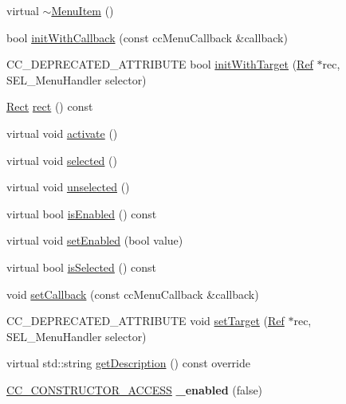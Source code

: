 \begin{DoxyCompactItemize}
virtual \hyperlink{classMenuItem_a41c6086a4d066256ecb7bfa715059ea2}{$\sim$\+Menu\+Item} ()
\item 
bool \hyperlink{classMenuItem_a15599490c1ba216f1a87394b798859dd}{init\+With\+Callback} (const cc\+Menu\+Callback \&callback)
\item 
C\+C\+\_\+\+D\+E\+P\+R\+E\+C\+A\+T\+E\+D\+\_\+\+A\+T\+T\+R\+I\+B\+U\+TE bool \hyperlink{classMenuItem_af427b11bfc6e76d5d2c93c94dafd7aa6}{init\+With\+Target} (\hyperlink{classRef}{Ref} $\ast$rec, S\+E\+L\+\_\+\+Menu\+Handler selector)
\item 
\hyperlink{classRect}{Rect} \hyperlink{classMenuItem_a3d6b05193856cc8d5e5e2a2d98736e4c}{rect} () const
\item 
virtual void \hyperlink{classMenuItem_a914d3ef5d07ab6da23618d4d8c3e33cd}{activate} ()
\item 
virtual void \hyperlink{classMenuItem_a4ae00eee33600b702f1019643d6b0ccf}{selected} ()
\item 
virtual void \hyperlink{classMenuItem_a515f26e1cfec9e1f46bdd898c5698723}{unselected} ()
\item 
virtual bool \hyperlink{classMenuItem_ad55ab1194b24473df5fef4ae12ac22f7}{is\+Enabled} () const
\item 
virtual void \hyperlink{classMenuItem_ac7bf0c009319b077ee6f34ee6b83ae03}{set\+Enabled} (bool value)
\item 
virtual bool \hyperlink{classMenuItem_a1c6d2c32aa42988ecb019a5009a8c005}{is\+Selected} () const
\item 
void \hyperlink{classMenuItem_a313b2ac1d809dea921aacc47ad8aef0f}{set\+Callback} (const cc\+Menu\+Callback \&callback)
\item 
C\+C\+\_\+\+D\+E\+P\+R\+E\+C\+A\+T\+E\+D\+\_\+\+A\+T\+T\+R\+I\+B\+U\+TE void \hyperlink{classMenuItem_a8741a2206467de455af86965f0ecfd86}{set\+Target} (\hyperlink{classRef}{Ref} $\ast$rec, S\+E\+L\+\_\+\+Menu\+Handler selector)
\item 
virtual std\+::string \hyperlink{classMenuItem_adfbe1ff271fb56adcffc38142c1e7a35}{get\+Description} () const override
\item 
\mbox{\label{classMenuItem_a6902987db7236178cfe51db03c4f648a}} 
\hyperlink{_2cocos2d_2cocos_2base_2ccConfig_8h_a25ef1314f97c35a2ed3d029b0ead6da0}{C\+C\+\_\+\+C\+O\+N\+S\+T\+R\+U\+C\+T\+O\+R\+\_\+\+A\+C\+C\+E\+SS} {\bfseries \+\_\+enabled} (false)
\item 
\mbox{\label{classMenuItem_a16534749a52ad7bdadc76de169a662e8}} 

\end{DoxyCompactItemize}
